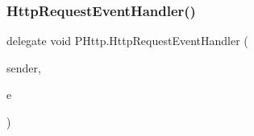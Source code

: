 \mbox{\label{namespace_p_http_a746b16e27637dd7ea95bb9256e7a93ff}} 
\subsubsection{\texorpdfstring{Http\+Request\+Event\+Handler()}{HttpRequestEventHandler()}}
{\footnotesize\ttfamily delegate void P\+Http.\+Http\+Request\+Event\+Handler (\begin{DoxyParamCaption}\item[{object}]{sender,  }\item[{\hyperlink{class_p_http_1_1_http_request_event_args}{Http\+Request\+Event\+Args}}]{e }\end{DoxyParamCaption})}


